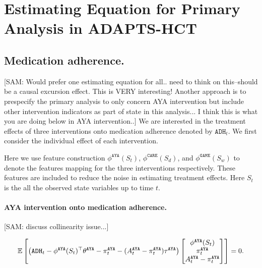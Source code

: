 \documentclass{article}
\newcommand{\sam}[1]{
  {\color{blue} [SAM: {#1}]}
 }
\def\AYA{{\texttt{AYA}}}
\def\EDGE{{\texttt{GAME}}}
\def\CARE{{\texttt{CARE}}}
\def\ADH{{\texttt{ADH}}}
\begin{document}



\section{Estimating Equation for Primary Analysis in ADAPTS-HCT}

\subsection{Medication adherence.} \sam{Would prefer one estimating equation for all.. need to think on this--should be a causal excursion effect.  This is VERY interesting!  Another approach is to prespecify the primary analysis to only concern AYA intervention but include other intervention indicators as part of state in this analysis...  I think this is what you are doing below in AYA intervention..} We are interested in the treatment effects of three interventions onto medication adherence denoted by $\ADH_t$. We first consider the individual effect of each intervention. 

Here we use feature construction $\phi^{\AYA}(S_t)$, $\phi^{\CARE}(S_d)$, and $\phi^{\EDGE}(S_w)$ to denote the features mapping for the three interventions respectively. These features are included to reduce the noise in estimating treatment effects. Here $S_t$ is the all the observed state variables up to time $t$.

\paragraph{AYA intervention onto medication adherence.}

\sam{discuss collinearity issue...}
\begin{align*}
    \E\left[\left(\ADH_t - \phi^{\AYA}(S_t)^{\top} \theta^{\AYA} - \pi_{t}^{\AYA} - (A_t^{\AYA} - \pi_{t}^{\AYA}) \tau^{\AYA} \right) \begin{bmatrix}  \phi^{\AYA}(S_t) \\ \pi_{t}^{\AYA} \\ A_t^{\AYA}-\pi_{t}^{\AYA} \end{bmatrix} \right] = 0.
\end{align*}
\end{document}
